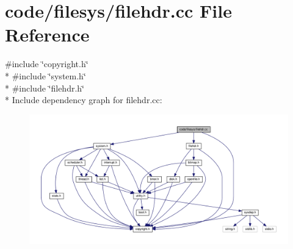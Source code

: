 \section{code/filesys/filehdr.cc File Reference}
\label{filehdr_8cc}
{\ttfamily \#include \char`\"{}copyright.\+h\char`\"{}}\\*
{\ttfamily \#include \char`\"{}system.\+h\char`\"{}}\\*
{\ttfamily \#include \char`\"{}filehdr.\+h\char`\"{}}\\*
Include dependency graph for filehdr.\+cc\+:
\nopagebreak
\begin{figure}[H]
\begin{center}
\leavevmode
\includegraphics[width=350pt]{filehdr_8cc__incl}
\end{center}
\end{figure}
